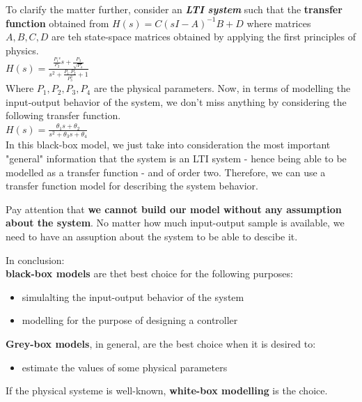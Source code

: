 To clarify the matter further, consider an \textbf{\textit{LTI system}} such that the \textbf{transfer function} obtained from \(H(s) = C (sI - A)^{-1}B +D\) where matrices \(A, B, C, D\) are teh state-space matrices obtained by applying the first principles of physics.\\

\(
H(s) = \frac{ \frac{P_1²}{P_2} s + \frac{P_3}{\sqrt{P_4}}}{s^2 + \frac{P_1.P_2}{P_3^3} + 1}
\)\\

Where \(P_1, P_2, P_3, P_4\) are the physical parameters. Now, in terms of modelling the input-output behavior of the system, we don't miss anything by considering the following transfer function.\\

\(
H(s) = \frac{\theta_1 s + \theta_2}{s^2 + \theta_3 s + \theta_4}
\)\\

In this black-box model, we just take into consideration the most important "general" information that the system is an LTI system - hence being able to be modelled as a transfer function - and of order two. Therefore, we can use a transfer function model for describing the system behavior.\\

\begin{factbox}
    Pay attention that \textbf{we cannot build our model without any assumption about the system}. No matter how much input-output sample is available,  we need to have an assuption about the system to be able to descibe it.
\end{factbox}

In conclusion: \\
\textbf{black-box models} are thet best choice for the following purposes:
\begin{itemize}
    \item simulalting the input-output behavior of the system
    \item modelling for the purpose of designing a controller\\
\end{itemize}

\textbf{Grey-box models}, in general, are the best choice when it is desired to:
\begin{itemize}
    \item estimate the values of some physical parameters \\
\end{itemize}

If the physical systeme is well-known, \textbf{white-box modelling} is the choice.

